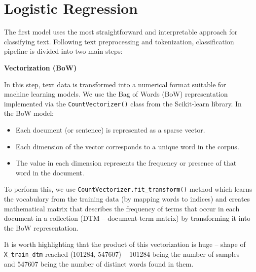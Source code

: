 


\section{Logistic Regression}
\label{logistic_regression}

The first model uses the most straightforward and interpretable approach for classifying text. Following text preprocessing and tokenization, classification pipeline is divided into two main steps:

\newpage

\textbf{\large Vectorization (BoW)}

In this step, text data is transformed into a numerical format suitable for machine learning models. We use the Bag of Words (BoW) representation implemented via the \texttt{CountVectorizer()} class from the Scikit-learn library. In the BoW model:

\begin{itemize}
    \item Each document (or sentence) is represented as a sparse vector.
    \item Each dimension of the vector corresponds to a unique word in the corpus.
    \item The value in each dimension represents the frequency or presence of that word in the document.
\end{itemize}

To perform this, we use \texttt{CountVectorizer.fit\_transform()} method which learns the vocabulary from the training data (by mapping words to indices) and creates mathematical matrix that describes the frequency of terms that occur in each document in a collection (DTM -- document-term matrix) by transforming it into the BoW representation.


\vspace{3mm}

It is worth highlighting that the product of this vectorization is huge -- shape of \texttt{X\_train\_dtm} reached (101284, 547607) -- 101284 being the number of samples and 547607 being the number of distinct words found in them.

